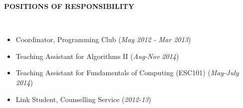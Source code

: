 \documentclass[10pt]{article}
\newcommand{\cvsectiontitle}[1]{
    		\colorbox{gray!40}{%
        \begin{minipage}{0.989\linewidth}%
            \vspace*{1pt}%
            \large\indent\textbf{#1}
            \vspace*{1pt}%
        \end{minipage}%
   		}\\[1mm]
		}
\begin{document}
\cvsectiontitle{POSITIONS OF RESPONSIBILITY}
\vspace{-0.6cm}
\begin{itemize}[leftmargin=0.5cm]
\item Coordinator, Programming Club (\textit{May 2012 - Mar 2013})
\item Teaching Assistant for Algorithms II (\textit{Aug-Nov 2014})
\item Teaching Assistant for Fundamentals of Computing (ESC101) (\textit{May-July 2014})
\item Link Student, Counselling Service (\textit{2012-13})
\end{itemize}
\end{document}
